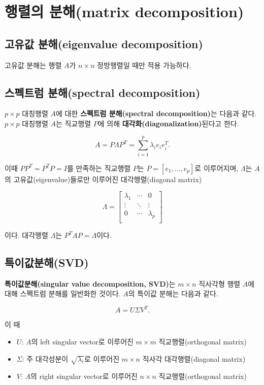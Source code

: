 \documentclass[b5paper,]{book}
\theoremstyle{definition}
\theoremstyle{definition}
\theoremstyle{definition}
\theoremstyle{remark}
\begin{document}
\section{행렬의 분해(matrix decomposition)}\label{-matrix-decomposition}

\subsection{고유값 분해(eigenvalue
decomposition)}\label{-eigenvalue-decomposition}

고유값 분해는 행렬 \(A\)가 \(n\times n\) 정방행렬일 때만 적용 가능하다.

\subsection{스펙트럼 분해(spectral
decomposition)}\label{-spectral-decomposition}

\(p\times p\) 대칭행렬 \(A\)에 대한 \textbf{스펙트럼 분해(spectral
decomposition)}는 다음과 같다. \(p\times p\) 대칭행렬 \(A\)는 직교행렬
\(P\)에 의해 \textbf{대각화(diagonalization)}된다고 한다.

\[A=P\Lambda P^{T}=\sum_{i=1}^{p}\lambda_{i}e_{i}e_{i}^{T}.\]

이때 \(PP^{T}=P^{T}P=I\)를 만족하는 직교행렬 \(P\)는
\(P=[e_{1},\ldots , e_{p}]\)로 이루어지며, \(\Lambda\)는 \(A\)의
고유값(eigenvalue)들로만 이루어진 대각행렬(diagonal matrix)

\[
\Lambda=
\begin{bmatrix}
\lambda_{1} & \cdots & 0\\
\vdots & \ddots & \vdots\\
0 & \cdots & \lambda_{p}\\
\end{bmatrix}
\]

이다. 대각행렬 \(\Lambda\)는 \(P^{T}AP=\Lambda\)이다.

\subsection{특이값분해(SVD)}\label{svd}

\textbf{특이값분해(singular value decomposition, SVD)}는 \(m\times n\)
직사각형 행렬 \(A\)에 대해 스펙트럼 분해를 일반화한 것이다. \(A\)의
특이값 분해는 다음과 같다.

\[A=U\Sigma V^{T}.\]

이 때

\begin{itemize}
\item
  \(U\): \(A\)의 left singular vector로 이루어진 \(m\times m\)
  직교행렬(orthogonal matrix)
\item
  \(\Sigma\): 주 대각성분이 \(\sqrt{\lambda_{i}}\)로 이루어진
  \(m\times n\) 직사각 대각행렬(diagonal matrix)
\item
  \(V\): \(A\)의 right singular vector로 이루어진 \(n\times n\)
  직교행렬(orthogonal matrix)
\end{itemize}
\end{document}
